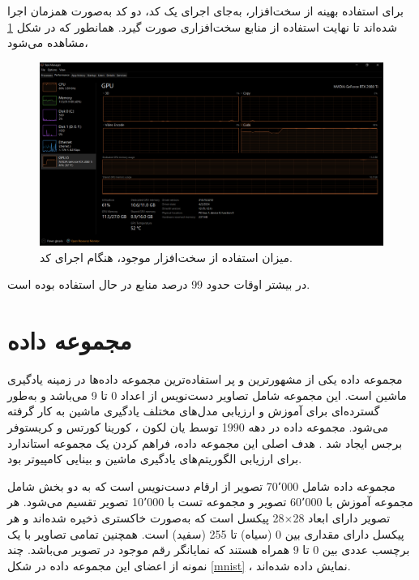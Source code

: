 برای استفاده بهینه از سخت‌افزار، به‌جای اجرای یک کد، دو کد به‌صورت همزمان اجرا شده‌اند تا نهایت استفاده از منابع سخت‌افزاری صورت گیرد. همانطور که در شکل
\ref{task_manager}
مشاهده می‌شود،
\begin{figure}[b!]
	\centering
	\includegraphics[scale=0.225]{images/chap5/task_manager_inverted_color.png}%
	\caption{%
		میزان استفاده از سخت‌افزار موجود، هنگام اجرای کد.
	}
	\label{task_manager}
	\centering
\end{figure}
در بیشتر اوقات حدود 99 درصد منابع
%
در حال استفاده بوده است.






\section{
مجموعه داده
}

مجموعه داده
یکی از مشهورترین و پر استفاده‌ترین مجموعه داده‌ها در زمینه یادگیری ماشین است. این مجموعه شامل تصاویر دست‌نویس از اعداد 0 تا 9 می‌باشد و به‌طور گسترده‌ای برای آموزش و ارزیابی مدل‌های مختلف یادگیری ماشین به کار گرفته می‌شود.
مجموعه داده
در دهه 1990 توسط یان لکون%
،
کورینا کورتس%
و کریستوفر برجس%
 ایجاد شد
 \cite{lecun1998gradient}.
 هدف اصلی این مجموعه داده، فراهم کردن یک مجموعه استاندارد برای ارزیابی الگوریتم‌های یادگیری ماشین و بینایی کامپیوتر بود.

مجموعه داده
شامل 70٬000 تصویر از ارقام دست‌نویس است که به دو بخش شامل مجموعه آموزش با 60٬000 تصویر و مجموعه تست با 10٬000 تصویر تقسیم می‌شود. هر تصویر دارای ابعاد
28$\times$28
پیکسل است که به‌صورت خاکستری%
ذخیره شده‌اند و هر پیکسل دارای مقداری بین 0 (سیاه) تا 255 (سفید) است. همچنین تمامی تصاویر با یک برچسب عددی بین 0 تا 9 همراه هستند که نمایانگر رقم موجود در تصویر می‌باشد.
چند نمونه از اعضای این مجموعه داده در شکل
\ref{mnist}%
، نمایش داده شده‌اند.

